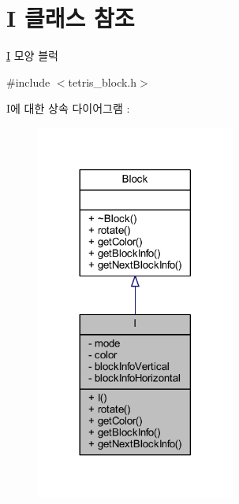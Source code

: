 \hypertarget{class_i}{}\section{I 클래스 참조}
\label{class_i}


\mbox{\hyperlink{class_i}{I}} 모양 블럭  




{\ttfamily \#include $<$tetris\+\_\+block.\+h$>$}



I에 대한 상속 다이어그램 \+: 
\nopagebreak
\begin{figure}[H]
\begin{center}
\leavevmode
\includegraphics[width=185pt]{class_i__inherit__graph}
\end{center}
\end{figure}


